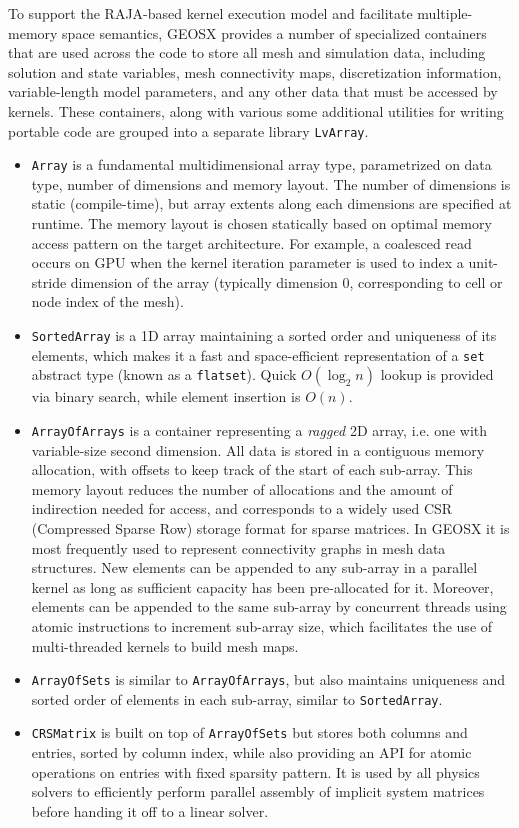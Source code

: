 To support the RAJA-based kernel execution model and facilitate multiple-memory space semantics, GEOSX provides a number of specialized containers that are used across the code to store all mesh and simulation data, including solution and state variables, mesh connectivity maps, discretization information, variable-length model parameters, and any other data that must be accessed by kernels.   These containers, along with various some additional utilities for writing portable code are grouped into a separate library \texttt{LvArray}.
\begin{itemize}
    \item \texttt{Array} is a fundamental multidimensional array type, parametrized on data type, number of dimensions and memory layout.   The number of dimensions is static (compile-time), but array extents along each dimensions are specified at runtime.   The memory layout is chosen statically based on optimal memory access pattern on the target architecture.   For example, a coalesced read occurs on GPU when the kernel iteration parameter is used to index a unit-stride dimension of the array (typically dimension 0, corresponding to cell or node index of the mesh).
    \item \texttt{SortedArray} is a 1D array maintaining a sorted order and uniqueness of its elements, which makes it a fast and space-efficient representation of a \texttt{set} abstract type (known as a \texttt{flatset}). Quick $O(\log_2 n)$ lookup is provided via binary search, while element insertion is $O(n)$.
    \item \texttt{ArrayOfArrays} is a container representing a \textit{ragged} 2D array, i.e. one with variable-size second dimension.   All data is stored in a contiguous memory allocation, with offsets to keep track of the start of each sub-array.   This memory layout reduces the number of allocations and the amount of indirection needed for access, and corresponds to a widely used CSR (Compressed Sparse Row) storage format for sparse matrices.   In GEOSX it is most frequently used to represent connectivity graphs in mesh data structures.   New elements can be appended to any sub-array in a parallel kernel as long as sufficient capacity has been pre-allocated for it.   Moreover, elements can be appended to the same sub-array by concurrent threads using atomic instructions to increment sub-array size, which facilitates the use of multi-threaded kernels to build mesh maps.
    \item \texttt{ArrayOfSets} is similar to \texttt{ArrayOfArrays}, but also maintains uniqueness and sorted order of elements in each sub-array, similar to \texttt{SortedArray}.
    \item \texttt{CRSMatrix} is built on top of \texttt{ArrayOfSets} but stores both columns and entries, sorted by column index, while also providing an API for atomic operations on entries with fixed sparsity pattern.   It is used by all physics solvers to efficiently perform parallel assembly of implicit system matrices before handing it off to a linear solver.
\end{itemize}
